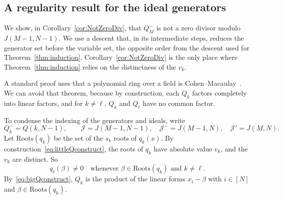 \documentclass[12pt]{amsart}
\theoremstyle{definition}
\theoremstyle{remark}
\newcommand{\cJ}{\mathcal J}
\newcommand{\Roots}{\mathrm{Roots}}
\begin{document}
\subsection{A regularity result for the ideal generators}\label{subsec:regular}

We show, in Corollary~\ref{cor:NotZeroDiv},
that
$Q^-_M$ is not a zero divisor modulo $J(M-1, N-1)$.
We use a descent that, in its
intermediate steps, reduces the generator set before the variable set,
the opposite order from the descent used for Theorem~\ref{thm:induction}.
Corollary~\ref{cor:NotZeroDiv} is the only place where
Theorem~\ref{thm:induction} relies on the
distinctness of the $v_k$.

A standard proof
uses that a polynomial ring over a field
is Cohen--Macaulay~\cite[Prop.~18.9]{Eisenbud1995}.
We can avoid that theorem, because by
construction, each $Q_k$ factors completely into
linear factors, and for $k \neq \ell$, $Q_k$ and $Q_\ell$ have no
common factor.

To condense the indexing of the generators and ideals, write
\[
Q^-_k = Q(k, N-1), \qquad
\cJ = J(M-1, N-1), \quad \cJ^- = J(M-1, N), \quad \cJ' = J(M, N).
\]
Let $\Roots(q_k)$ be the set of the $s_k$ roots of $q_k(x)$.
By construction~\eqref{eq:littleQconstruct}, the roots of $q_k$ have absolute
value $v_k$, and the $v_k$ are distinct.  So
\begin{equation}\label{eq:qKnonzero}
q_\ell(\beta) \neq 0 \quad \text{whenever } \beta \in \Roots(q_k)
\text{ and } k \neq \ell.
\end{equation}
By~\eqref{eq:bigQconstruct}, $Q_k$ is the product of the linear forms
$x_i - \beta$ with $i \in [N]$ and $\beta \in \Roots(q_k)$.
\end{document}
